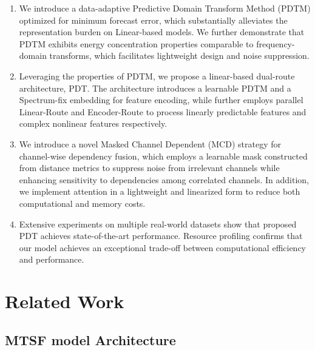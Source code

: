 \documentclass[final,3p,times]{elsarticle}
\begin{document}
\begin{enumerate}[\indent 1)]
\item We introduce a data-adaptive Predictive Domain Transform Method (PDTM) optimized for minimum forecast error, which substantially alleviates the representation burden on Linear-based models. We further demonstrate that PDTM exhibits energy concentration properties comparable to frequency-domain transforms, which facilitates lightweight design and noise suppression.
\item Leveraging the properties of PDTM, we propose a linear-based dual-route architecture, PDT. The architecture introduces a learnable PDTM and a Spectrum-fix embedding for feature encoding, while further employs parallel Linear-Route and Encoder-Route to process linearly predictable features and complex nonlinear features respectively.
\item We introduce a novel Masked Channel Dependent (MCD) strategy for channel-wise dependency fusion, which employs a learnable mask constructed from distance metrics to suppress noise from irrelevant channels while enhancing sensitivity to dependencies among correlated channels. In addition, we implement attention in a lightweight and linearized form to reduce both computational and memory costs.
\item Extensive experiments on multiple real-world datasets show that proposed PDT achieves state-of-the-art performance. Resource profiling confirms that our model achieves an exceptional trade-off between computational efficiency and performance.
\end{enumerate}


\section{Related Work}

\subsection{MTSF model Architecture}
\end{document}
